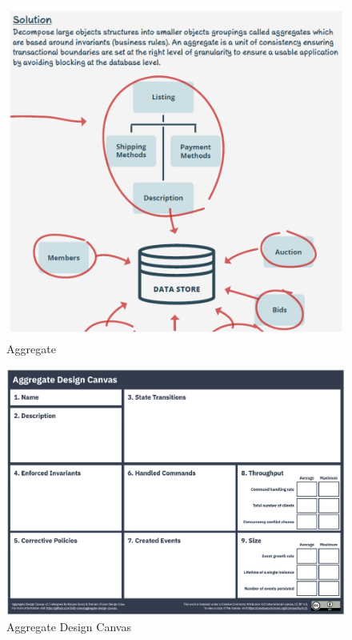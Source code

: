 \documentclass[../Main.tex]{subfiles}
\begin{document}
\begin{figure}[H]
    \centering
    \includegraphics[width=0.75\linewidth]{Images/aggregate.png}
    \caption{Aggregate}
\end{figure}

\begin{figure}[H]
    \centering
    \includegraphics[width=1\linewidth]{Images/aggregate-design-canvas.png}
    \caption{Aggregate Design Canvas}
\end{figure}
\end{document}
